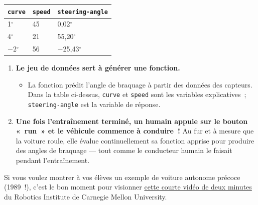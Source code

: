 \documentclass[12pt,a4paper]{article}
\begin{document}
\begin{center}
\begin{tabular}{l l l}
  \toprule
  \texttt{curve} & \texttt{speed} & \texttt{steering-angle} \\
  \midrule
  1$^\circ$  & 45 & 0,02$^\circ$ \\
  4$^\circ$  & 21 & 55,20$^\circ$ \\
  $-$2$^\circ$ & 56 & $-$25,43$^\circ$ \\
  \bottomrule
\end{tabular}
\end{center}

\begin{enumerate}[leftmargin=*, resume]
  \item \textbf{Le jeu de données sert à générer une fonction.}
  \begin{itemize}
    \item La fonction prédit l'angle de braquage à partir des données des capteurs. Dans la table ci-dessus, \texttt{curve} et \texttt{speed} sont les variables explicatives~; \texttt{steering-angle} est la variable de réponse.
  \end{itemize}
  \item \textbf{Une fois l'entraînement terminé, un humain appuie sur le bouton «~run~» et le véhicule commence à conduire~!} Au fur et à mesure que la voiture roule, elle évalue continuellement sa fonction apprise pour produire des angles de braquage — tout comme le conducteur humain le faisait pendant l'entraînement.
\end{enumerate}

\begin{instructornotes}
  Si vous voulez montrer à vos élèves un exemple de voiture autonome précoce (1989~!), c'est le bon moment pour visionner \href{https://www.youtube.com/watch?v=ntIczNQKfjQ}{cette courte vidéo de deux minutes} du Robotics Institute de Carnegie Mellon University.
\end{instructornotes}
\end{document}
